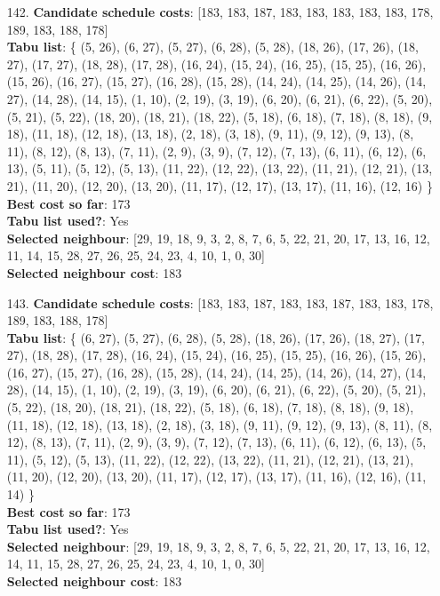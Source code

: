 \documentclass[fleqn]{article}
\begin{document}
\begin{itemize}
    \item[142.] \textbf{Candidate schedule costs}: [183, 183, 187, 183, 183, 183, 183, 183, 178, 189, 183, 188, 178] \\
    \textbf{Tabu list}: \{ (5, 26), (6, 27), (5, 27), (6, 28), (5, 28), (18, 26), (17, 26), (18, 27), (17, 27), (18, 28), (17, 28), (16, 24), (15, 24), (16, 25), (15, 25), (16, 26), (15, 26), (16, 27), (15, 27), (16, 28), (15, 28), (14, 24), (14, 25), (14, 26), (14, 27), (14, 28), (14, 15), (1, 10), (2, 19), (3, 19), (6, 20), (6, 21), (6, 22), (5, 20), (5, 21), (5, 22), (18, 20), (18, 21), (18, 22), (5, 18), (6, 18), (7, 18), (8, 18), (9, 18), (11, 18), (12, 18), (13, 18), (2, 18), (3, 18), (9, 11), (9, 12), (9, 13), (8, 11), (8, 12), (8, 13), (7, 11), (2, 9), (3, 9), (7, 12), (7, 13), (6, 11), (6, 12), (6, 13), (5, 11), (5, 12), (5, 13), (11, 22), (12, 22), (13, 22), (11, 21), (12, 21), (13, 21), (11, 20), (12, 20), (13, 20), (11, 17), (12, 17), (13, 17), (11, 16), (12, 16) \} \\
    \textbf{Best cost so far}: 173 \\
    \textbf{Tabu list used?}: Yes \\
    \textbf{Selected neighbour}: [29, 19, 18, 9, 3, 2, 8, 7, 6, 5, 22, 21, 20, 17, 13, 16, 12, 11, 14, 15, 28, 27, 26, 25, 24, 23, 4, 10, 1, 0, 30] \\
    \textbf{Selected neighbour cost}: 183
      

    \item[143.] \textbf{Candidate schedule costs}: [183, 183, 187, 183, 183, 187, 183, 183, 178, 189, 183, 188, 178] \\
    \textbf{Tabu list}: \{ (6, 27), (5, 27), (6, 28), (5, 28), (18, 26), (17, 26), (18, 27), (17, 27), (18, 28), (17, 28), (16, 24), (15, 24), (16, 25), (15, 25), (16, 26), (15, 26), (16, 27), (15, 27), (16, 28), (15, 28), (14, 24), (14, 25), (14, 26), (14, 27), (14, 28), (14, 15), (1, 10), (2, 19), (3, 19), (6, 20), (6, 21), (6, 22), (5, 20), (5, 21), (5, 22), (18, 20), (18, 21), (18, 22), (5, 18), (6, 18), (7, 18), (8, 18), (9, 18), (11, 18), (12, 18), (13, 18), (2, 18), (3, 18), (9, 11), (9, 12), (9, 13), (8, 11), (8, 12), (8, 13), (7, 11), (2, 9), (3, 9), (7, 12), (7, 13), (6, 11), (6, 12), (6, 13), (5, 11), (5, 12), (5, 13), (11, 22), (12, 22), (13, 22), (11, 21), (12, 21), (13, 21), (11, 20), (12, 20), (13, 20), (11, 17), (12, 17), (13, 17), (11, 16), (12, 16), (11, 14) \} \\
    \textbf{Best cost so far}: 173 \\
    \textbf{Tabu list used?}: Yes \\
    \textbf{Selected neighbour}: [29, 19, 18, 9, 3, 2, 8, 7, 6, 5, 22, 21, 20, 17, 13, 16, 12, 14, 11, 15, 28, 27, 26, 25, 24, 23, 4, 10, 1, 0, 30] \\
    \textbf{Selected neighbour cost}: 183
      


\end{itemize}
\end{document}
